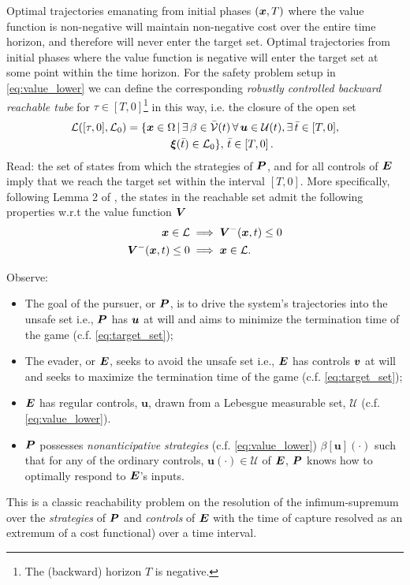 Optimal trajectories emanating from initial phases $(\bm{x},T)$ where the value function is non-negative will maintain non-negative cost over the entire time horizon, and therefore will never enter the target set. Optimal trajectories from initial phases where the value function is negative will enter the target set at some point within the time horizon.  For the safety problem setup in \eqref{eq:value_lower} we can define the corresponding \textit{robustly controlled backward reachable tube} for $\tau \in [T, 0]$\footnote{The (backward) horizon $T$ is negative.} in this way, i.e. the closure of the open set
%
\begin{align}
	\mathcal{L}([\tau, 0], \mathcal{L}_0) &= \{\state \in \openset \,| \, \exists \, \beta \in \mathcal{\bar{V}}(t) \,  \forall \, \bm{u} \in \mathcal{U}(t), \exists \, \bar{t} \in [T, 0], \nonumber \\
	& \qquad  \qquad \bm{\xi}(\bar{t})%
	\in  \mathcal{L}_0 \}, \,\bar{t} \in \left[T, 0\right].
	\label{eq:rcbrt}
\end{align}
%
Read: the set of states from which the strategies of $\bm{P}$, and for all controls of $\bm{E}$ imply that we reach the target set within the interval $[T, 0]$.   More specifically, following Lemma 2 of \cite{Mitchell2005}, the states in the reachable set admit the following properties w.r.t the value function $\bm{V}$
%
\begin{subequations}
	\begin{align}
		\bm{x} \in \mathcal{L} &\implies \bm{V}^-(\bm{x}, t) \le 0 \\
		\bm{V}^-(\bm{x}, t) \le 0 &\implies \bm{x} \in \mathcal{L}.
	\end{align}
\end{subequations}

Observe:
%
\begin{itemize}
	\item The goal of the pursuer, or $\bm{P}$, is to drive the system's trajectories into the unsafe set i.e., $\bm{P}$ has $\bm{u}$ at will and aims to minimize the termination time of the game  (c.f. \eqref{eq:target_set});
	\item The evader, or $\bm{E}$, seeks to avoid the unsafe  set i.e., $\bm{E}$ has controls $\bm{v}$ at will and seeks to maximize the termination time of the game (c.f.  \eqref{eq:target_set});
	\item $\bm{E}$ has regular controls, $\bm{u}$, drawn from a Lebesgue measurable set, $\mathcal{U}$ (c.f. \eqref{eq:value_lower}).
	\item $\bm{P}$ possesses \textit{nonanticipative strategies} (c.f. \eqref{eq:value_lower}) \ie  $\beta[\bm{u}](\cdot)$ such that for any of the ordinary controls, $\bm{u}(\cdot) \in \mathcal{U}$ of $\bm{E}$, $\bm{P}$ knows how to optimally respond to $\bm{E}$'s inputs.
\end{itemize}
%
This is a classic reachability problem on the resolution of the infimum-supremum over the \textit{strategies} of $\bm{P}$ and \textit{controls} of $\bm{E}$ with the time of capture resolved as an extremum of a cost functional) over a time interval.

